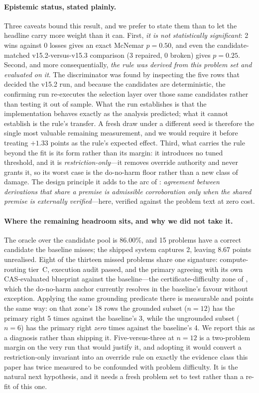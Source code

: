 \documentclass[11pt,a4paper]{article}
\begin{document}
\paragraph{Epistemic status, stated plainly.}
Three caveats bound this result, and we prefer to state them than to let the headline carry more weight than it can.
First, \emph{it is not statistically significant}: 2 wins against 0 losses gives an exact McNemar $p = 0.50$, and even the candidate-matched v15.2-versus-v15.3 comparison (3 repaired, 0 broken) gives $p = 0.25$.
Second, and more consequentially, \emph{the rule was derived from this problem set and evaluated on it}. The discriminator was found by inspecting the five rows that decided the v15.2 run, and because the candidates are deterministic, the confirming run re-executes the selection layer over those same candidates rather than testing it out of sample. What the run establishes is that the implementation behaves exactly as the analysis predicted; what it cannot establish is the rule's transfer. A fresh draw under a different seed is therefore the single most valuable remaining measurement, and we would require it before treating $+1.33$ points as the rule's expected effect.
Third, what carries the rule beyond the fit is its form rather than its margin: it introduces no tuned threshold, and it is \emph{restriction-only}---it removes override authority and never grants it, so its worst case is the do-no-harm floor rather than a new class of damage.
The design principle it adds to the arc of : \emph{agreement between derivations that share a premise is admissible corroboration only when the shared premise is externally verified}---here, verified against the problem text at zero cost.
\paragraph{Where the remaining headroom sits, and why we did not take it.}
The oracle over the candidate pool is 86.00\%, and 15 problems have a correct candidate the baseline misses; the shipped system captures 2, leaving 8.67 points unrealised.
Eight of the thirteen missed problems share one signature: compute-routing tier~C, execution audit passed, and the primary agreeing with its own CAS-evaluated blueprint against the baseline---the certificate-difficulty zone of , which the do-no-harm anchor currently resolves in the baseline's favour without exception.
Applying the same grounding predicate there is measurable and points the same way: on that zone's 18 rows the grounded subset ($n{=}12$) has the primary right 5 times against the baseline's 3, while the ungrounded subset ($n{=}6$) has the primary right \emph{zero} times against the baseline's 4.
We report this as a diagnosis rather than shipping it. Five-versus-three at $n{=}12$ is a two-problem margin on the very run that would justify it, and adopting it would convert a restriction-only invariant into an override rule on exactly the evidence class this paper has twice measured to be confounded with problem difficulty.
It is the natural next hypothesis, and it needs a fresh problem set to test rather than a re-fit of this one.
\end{document}
